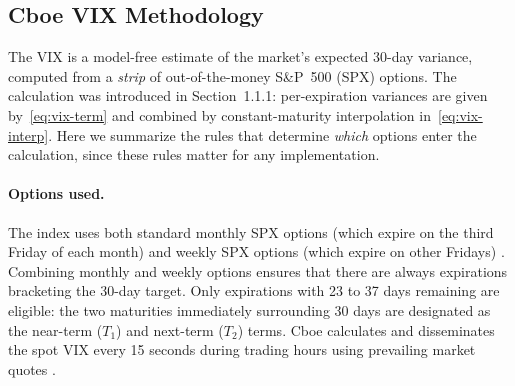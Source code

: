 %



\subsection{Cboe VIX Methodology}
\label{sec:vix-method}

The VIX is a model-free estimate of the market's expected 30-day variance, computed from a \emph{strip} of out-of-the-money S\&P~500 (SPX) options. The calculation was introduced in Section~1.1.1: per-expiration variances are given by~\eqref{eq:vix-term} and combined by constant-maturity interpolation in~\eqref{eq:vix-interp}. Here we summarize the rules that determine \emph{which} options enter the calculation, since these rules matter for any implementation.

\paragraph{Options used.} The index uses both standard monthly SPX options (which expire on the third Friday of each month) and weekly SPX options (which expire on other Fridays) \cite{cboewp}. Combining monthly and weekly options ensures that there are always expirations bracketing the 30-day target. Only expirations with 23 to 37 days remaining are eligible: the two maturities immediately surrounding 30 days are designated as the near-term ($T_1$) and next-term ($T_2$) terms. Cboe calculates and disseminates the spot VIX every 15 seconds during trading hours using prevailing market quotes \cite{cboewp}.

